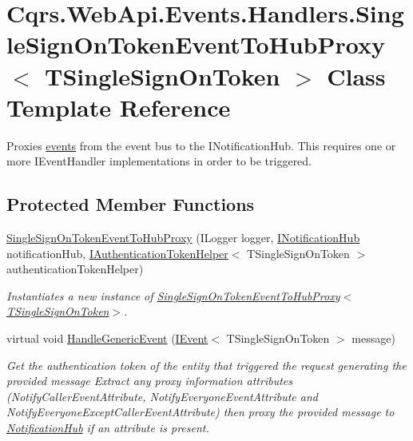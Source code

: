 \hypertarget{classCqrs_1_1WebApi_1_1Events_1_1Handlers_1_1SingleSignOnTokenEventToHubProxy}{}\section{Cqrs.\+Web\+Api.\+Events.\+Handlers.\+Single\+Sign\+On\+Token\+Event\+To\+Hub\+Proxy$<$ T\+Single\+Sign\+On\+Token $>$ Class Template Reference}
\label{classCqrs_1_1WebApi_1_1Events_1_1Handlers_1_1SingleSignOnTokenEventToHubProxy}


Proxies \hyperlink{}{events} from the event bus to the I\+Notification\+Hub. This requires one or more I\+Event\+Handler implementations in order to be triggered.  


\subsection*{Protected Member Functions}
\begin{DoxyCompactItemize}
\item 
\hyperlink{classCqrs_1_1WebApi_1_1Events_1_1Handlers_1_1SingleSignOnTokenEventToHubProxy_ad54ad4efb19787dbf07287bf1fa7816b_ad54ad4efb19787dbf07287bf1fa7816b}{Single\+Sign\+On\+Token\+Event\+To\+Hub\+Proxy} (I\+Logger logger, \hyperlink{interfaceCqrs_1_1WebApi_1_1SignalR_1_1Hubs_1_1INotificationHub}{I\+Notification\+Hub} notification\+Hub, \hyperlink{interfaceCqrs_1_1Authentication_1_1IAuthenticationTokenHelper}{I\+Authentication\+Token\+Helper}$<$ T\+Single\+Sign\+On\+Token $>$ authentication\+Token\+Helper)
\begin{DoxyCompactList}\small\item\em Instantiates a new instance of \hyperlink{classCqrs_1_1WebApi_1_1Events_1_1Handlers_1_1SingleSignOnTokenEventToHubProxy_ad54ad4efb19787dbf07287bf1fa7816b_ad54ad4efb19787dbf07287bf1fa7816b}{Single\+Sign\+On\+Token\+Event\+To\+Hub\+Proxy$<$\+T\+Single\+Sign\+On\+Token$>$}. \end{DoxyCompactList}\item 
virtual void \hyperlink{classCqrs_1_1WebApi_1_1Events_1_1Handlers_1_1SingleSignOnTokenEventToHubProxy_ad8ecdd318f7dc37de14760879fd52668_ad8ecdd318f7dc37de14760879fd52668}{Handle\+Generic\+Event} (\hyperlink{interfaceCqrs_1_1Events_1_1IEvent}{I\+Event}$<$ T\+Single\+Sign\+On\+Token $>$ message)
\begin{DoxyCompactList}\small\item\em Get the authentication token of the entity that triggered the request generating the provided {\itshape message}  Extract any proxy information attributes (Notify\+Caller\+Event\+Attribute, Notify\+Everyone\+Event\+Attribute and Notify\+Everyone\+Except\+Caller\+Event\+Attribute) then proxy the provided {\itshape message}  to \hyperlink{classCqrs_1_1WebApi_1_1Events_1_1Handlers_1_1SingleSignOnTokenEventToHubProxy_a9621749560e567a6252f3d7e2328174d_a9621749560e567a6252f3d7e2328174d}{Notification\+Hub} if an attribute is present. \end{DoxyCompactList}\end{DoxyCompactItemize}
